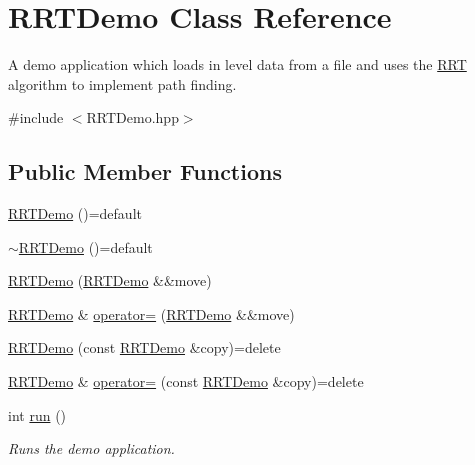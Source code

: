 \hypertarget{classRRTDemo}{\section{R\+R\+T\+Demo Class Reference}
\label{classRRTDemo}
}


A demo application which loads in level data from a file and uses the \hyperlink{classRRT}{R\+R\+T} algorithm to implement path finding.  




{\ttfamily \#include $<$R\+R\+T\+Demo.\+hpp$>$}

\subsection*{Public Member Functions}
\begin{DoxyCompactItemize}
\item 
\hyperlink{classRRTDemo_a88d8d4f92f291bbb932935f20da171c9}{R\+R\+T\+Demo} ()=default
\item 
\hyperlink{classRRTDemo_adc75c78f8a4171956a1e3acb96eb554a}{$\sim$\+R\+R\+T\+Demo} ()=default
\item 
\hyperlink{classRRTDemo_af0e18e723ba2a04b13b98d5657fc7d09}{R\+R\+T\+Demo} (\hyperlink{classRRTDemo}{R\+R\+T\+Demo} \&\&move)
\item 
\hyperlink{classRRTDemo}{R\+R\+T\+Demo} \& \hyperlink{classRRTDemo_ab19379aa75c89680171a19316f63b2d8}{operator=} (\hyperlink{classRRTDemo}{R\+R\+T\+Demo} \&\&move)
\item 
\hyperlink{classRRTDemo_afdf65a4f754494a9a0b344baf646c4c7}{R\+R\+T\+Demo} (const \hyperlink{classRRTDemo}{R\+R\+T\+Demo} \&copy)=delete
\item 
\hyperlink{classRRTDemo}{R\+R\+T\+Demo} \& \hyperlink{classRRTDemo_a157a367bd5c7927223ec1895bdebba63}{operator=} (const \hyperlink{classRRTDemo}{R\+R\+T\+Demo} \&copy)=delete
\item 
int \hyperlink{classRRTDemo_accb406ba71b9c8a09bfe51145d639dd8}{run} ()
\begin{DoxyCompactList}\small\item\em Runs the demo application. \end{DoxyCompactList}\end{DoxyCompactItemize}
